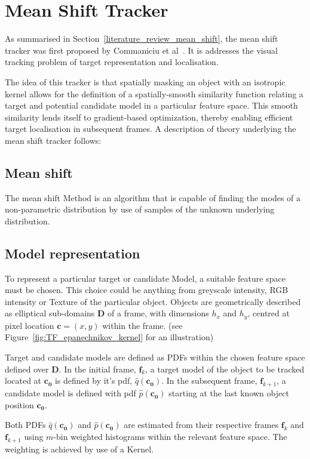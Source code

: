 \section{Mean Shift Tracker}\label{theoretical_framework_mean_shift_tracker}
As summarised in Section~\ref{literature_review_mean_shift}, the mean shift tracker was
first proposed by Commaniciu et al~\cite{Comaniciu2003}. It is addresses the
visual tracking problem of target representation and localisation.

The idea of this tracker is that spatially masking an object with an
isotropic kernel allows for the definition of a spatially-smooth similarity
function relating a target and potential candidate model in a particular feature
space. This smooth similarity lends itself to gradient-based optimization,
thereby enabling efficient target localisation in subsequent frames.
A description of theory underlying the mean shift tracker follows:

\subsection{Mean shift}\label{theoretical_framework_mean_shift}
The mean shift Method is an algorithm that is capable of finding the modes of a 
non-parametric distribution by use of samples of the unknown underlying distribution. 

\subsection{Model representation}
To represent a particular target or candidate Model, a suitable feature space
must be chosen. This choice could be anything from greyscale intensity, RGB
intensity or Texture of the particular object. Objects are geometrically described 
as elliptical sub-domains $\mathbf{D}$ of a frame, with dimensions $h_x$ and
$h_y$, centred at pixel location $\mathbf{c}=(x,y)$ within the frame. (see
Figure~\ref{fig:TF_epanechnikov_kernel} for an illustration)

Target and candidate models are defined as PDFs within the chosen feature
space defined over $\mathbf{D}$. In the initial frame, $\mathbf{f}_k$, a target
model of the object to be tracked located at $\mathbf{c_0}$ is defined by it's
pdf, $\hat{q}(\mathbf{c_0})$. In the subsequent frame, $\mathbf{f}_{k+1}$, a
candidate model is defined with pdf $\hat{p}(\mathbf{c_0})$ starting at the last
known object position $\mathbf{c_0}$. 

Both PDFs $\hat{q}(\mathbf{c_0})$ and $\hat{p}(\mathbf{c_0})$ are estimated from
their respective frames $\mathbf{f}_k$ and $\mathbf{f}_{k+1}$ using $m$-bin
weighted histograms within the relevant feature space. The weighting is achieved
by use of a Kernel. 

